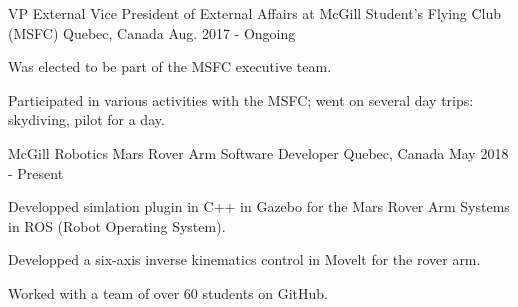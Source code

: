 
\begin{cventries}
\cventry
    {VP External}
    {Vice President of External Affairs at McGill Student's Flying Club (MSFC)}
    {Quebec, Canada}
    {Aug. 2017 - Ongoing}
    {
      \begin{cvitems}
        \item {Was elected to be part of the MSFC executive team.}
        \item {Participated in various activities with the MSFC; went on several day trips: skydiving, pilot for a day.}
      \end{cvitems}
    }    \newline

\cventry
    {McGill Robotics}
    {Mars Rover Arm Software Developer}
    {Quebec, Canada}
    {May 2018 - Present}
    {
      \begin{cvitems}
        \item {Developped simlation plugin in C++ in Gazebo for the Mars Rover Arm Systems in ROS (Robot Operating System).}
        \item {Developped a six-axis inverse kinematics control in Movelt for the rover arm.}
        \item {Worked with a team of over 60 students on GitHub.}
      \end{cvitems}
    }    \newline

\end{cventries}
